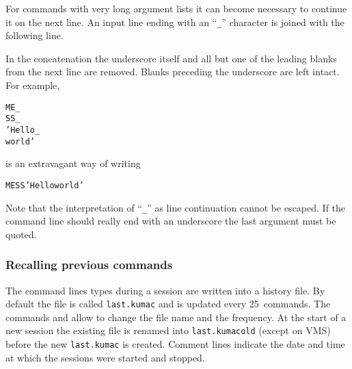 For commands with very long argument lists it can become necessary to
continue it on the next line.
An input line ending with an ``\verb!_!'' character is joined with
the following line.

In the concatenation the underscore itself and all but one of the
leading blanks from the next line are removed.
Blanks preceding the underscore are left intact.
For example,
\begin{alltt}
ME_
SS _
'Hello_
       world'
\end{alltt}
is an extravagant way of writing
\begin{alltt}
MESS 'Hello world'
\end{alltt}
Note that the interpretation of ``\verb!_!'' as line continuation
cannot be escaped.
If the command line should really end with an underscore the last
argument must be quoted.

%
%
\subsubsection{Recalling previous commands}

The command lines types during a session are written into a history file.
By default the file is called \texttt{last.kumac} and is updated every
25~commands.
The commands  and  allow to change the file
name and the frequency.
At the start of a new session the existing file is renamed into
\texttt{last.kumacold} (except on VMS) before the new \texttt{last.kumac} is created.
Comment lines indicate the date and time at which the sessions were
started and stopped. 

